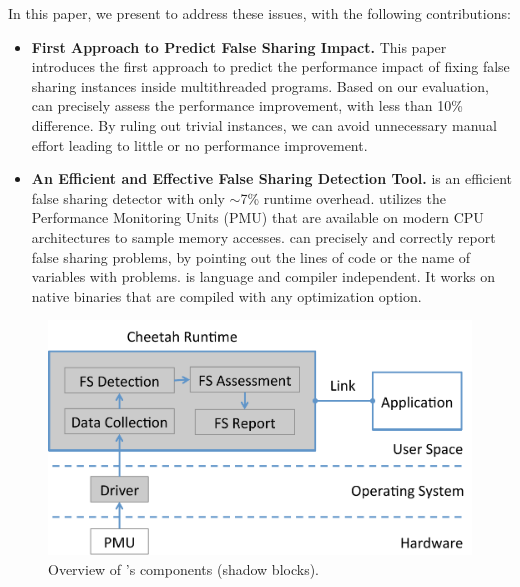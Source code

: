 In this paper, we present \cheetah{} to address these issues, with the following contributions:
\begin{itemize} 

\item {\bf First Approach to Predict False Sharing Impact.} This paper introduces the first approach to predict the performance impact of fixing false sharing instances inside multithreaded programs. Based on our evaluation, \cheetah{} can precisely assess the performance improvement, with less than 10\% difference. By ruling out trivial instances, we can avoid unnecessary manual effort leading to little or no performance improvement. 

\item {\bf An Efficient and Effective False Sharing Detection Tool.} \cheetah{} is an efficient false sharing detector with only $\sim$7\% runtime overhead. \Cheetah{} utilizes the Performance Monitoring Units (PMU) that are available on modern CPU architectures to sample memory accesses. \cheetah{} can precisely and correctly report false sharing problems, by pointing out the lines of code or the name of variables with problems. 
\cheetah{} is language and compiler independent. It works on native binaries that are compiled with any optimization option. 
\end{itemize}

\begin{figure}[htbp]
\centering
\includegraphics[width=.8\columnwidth]{figure/cheetahcomponents}
\caption{Overview of \cheetah{}'s components (shadow blocks).}
\label{fig:components}
\end{figure}



